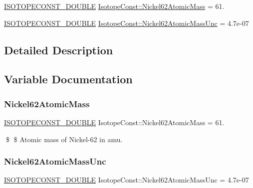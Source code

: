 \begin{DoxyCompactItemize}
\item 
\mbox{\hyperlink{group___isotope_const-_macros_ga8f45a7272ce02c0b4c65c44636ed719a}{I\+S\+O\+T\+O\+P\+E\+C\+O\+N\+S\+T\+\_\+\+D\+O\+U\+B\+LE}} \mbox{\hyperlink{group___isotope_const-_nickel-_ni62_ga8497c56bdeda306d3d815475275f1c0c}{Isotope\+Const\+::\+Nickel62\+Atomic\+Mass}} = 61.
\item 
\mbox{\hyperlink{group___isotope_const-_macros_ga8f45a7272ce02c0b4c65c44636ed719a}{I\+S\+O\+T\+O\+P\+E\+C\+O\+N\+S\+T\+\_\+\+D\+O\+U\+B\+LE}} \mbox{\hyperlink{group___isotope_const-_nickel-_ni62_ga511aff06582b2772c1c57deb1e62433e}{Isotope\+Const\+::\+Nickel62\+Atomic\+Mass\+Unc}} = 4.\+7e-\/07
\end{DoxyCompactItemize}


\subsection{Detailed Description}


\subsection{Variable Documentation}
\mbox{\label{group___isotope_const-_nickel-_ni62_ga8497c56bdeda306d3d815475275f1c0c}} 
\subsubsection{\texorpdfstring{Nickel62\+Atomic\+Mass}{Nickel62AtomicMass}}
{\footnotesize\ttfamily \mbox{\hyperlink{group___isotope_const-_macros_ga8f45a7272ce02c0b4c65c44636ed719a}{I\+S\+O\+T\+O\+P\+E\+C\+O\+N\+S\+T\+\_\+\+D\+O\+U\+B\+LE}} Isotope\+Const\+::\+Nickel62\+Atomic\+Mass = 61.}

\$ \$ Atomic mass of Nickel-\/62 in amu. \mbox{\label{group___isotope_const-_nickel-_ni62_ga511aff06582b2772c1c57deb1e62433e}} 
\subsubsection{\texorpdfstring{Nickel62\+Atomic\+Mass\+Unc}{Nickel62AtomicMassUnc}}
{\footnotesize\ttfamily \mbox{\hyperlink{group___isotope_const-_macros_ga8f45a7272ce02c0b4c65c44636ed719a}{I\+S\+O\+T\+O\+P\+E\+C\+O\+N\+S\+T\+\_\+\+D\+O\+U\+B\+LE}} Isotope\+Const\+::\+Nickel62\+Atomic\+Mass\+Unc = 4.\+7e-\/07}

